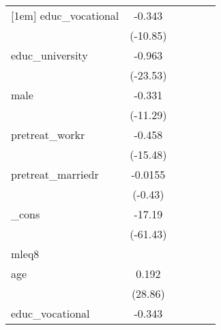 {\begin{tabular}{l*{5}{c}}
[1em]
educ\_vocational&      -0.343\sym{***}&                     &                     &                     &                     \\
            &    (-10.85)         &                     &                     &                     &                     \\
[1em]
educ\_university&      -0.963\sym{***}&                     &                     &                     &                     \\
            &    (-23.53)         &                     &                     &                     &                     \\
[1em]
male        &      -0.331\sym{***}&                     &                     &                     &                     \\
            &    (-11.29)         &                     &                     &                     &                     \\
[1em]
pretreat\_workr&      -0.458\sym{***}&                     &                     &                     &                     \\
            &    (-15.48)         &                     &                     &                     &                     \\
[1em]
pretreat\_marriedr&     -0.0155         &                     &                     &                     &                     \\
            &     (-0.43)         &                     &                     &                     &                     \\
[1em]
\_cons      &      -17.19\sym{***}&                     &                     &                     &                     \\
            &    (-61.43)         &                     &                     &                     &                     \\
\hline
mleq8       &                     &                     &                     &                     &                     \\
age         &       0.192\sym{***}&                     &                     &                     &                     \\
            &     (28.86)         &                     &                     &                     &                     \\
[1em]
educ\_vocational&      -0.343\sym{***}&                     &                     &                     &                     \\

\end{tabular}}
